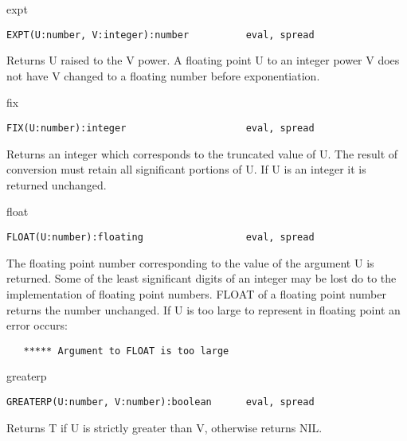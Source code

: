 \begin{Function}{expt}
\begin{verbatim}
EXPT(U:number, V:integer):number          eval, spread
\end{verbatim}
   Returns  U raised to  the V power.   A floating  point U to an
   integer  power V does not have  V changed to a floating number
   before exponentiation.

\end{Function}
\begin{Function}{fix}
\begin{verbatim}
FIX(U:number):integer                     eval, spread
\end{verbatim}
   Returns  an integer  which corresponds to  the truncated value
   of  U. The  result of  conversion must  retain all significant
   portions of U. If U is an integer it is returned unchanged.

\end{Function}
\begin{Function}{float}
\begin{verbatim}
FLOAT(U:number):floating                  eval, spread
\end{verbatim}
   The  floating point number  corresponding to the  value of the
   argument  U  is  returned.    Some  of  the  least significant
   digits  of an integer may be  lost do to the implementation of
   floating  point numbers.    FLOAT of  a floating  point number
   returns  the number unchanged.  If U is too large to represent
   in floating point an error occurs:
\begin{verbatim}
   ***** Argument to FLOAT is too large
\end{verbatim}
\end{Function}
\begin{Function}{greaterp}
\begin{verbatim}
GREATERP(U:number, V:number):boolean      eval, spread
\end{verbatim}
   Returns  T if U is strictly  greater than V, otherwise returns
   NIL.

\end{Function}
